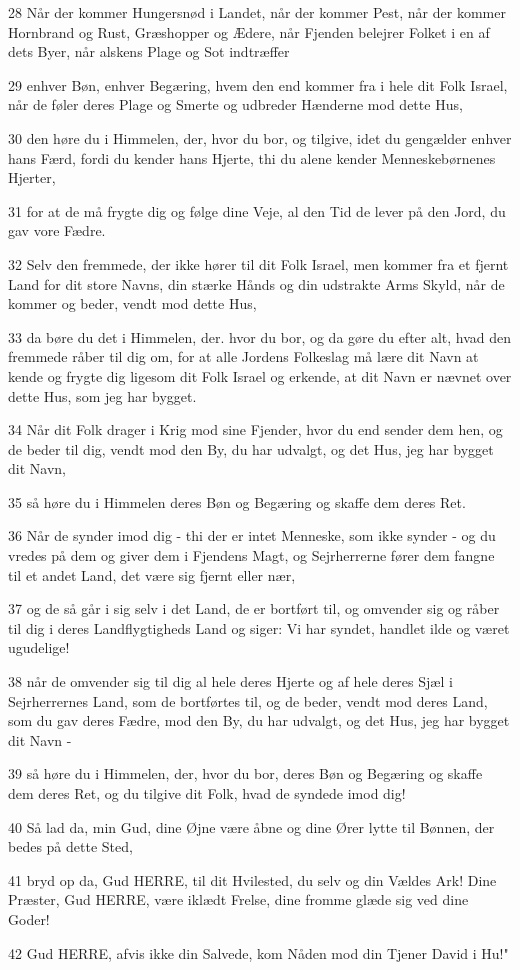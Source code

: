 \par 28 Når der kommer Hungersnød i Landet, når der kommer Pest, når der kommer Hornbrand og Rust, Græshopper og Ædere, når Fjenden belejrer Folket i en af dets Byer, når alskens Plage og Sot indtræffer
\par 29 enhver Bøn, enhver Begæring, hvem den end kommer fra i hele dit Folk Israel, når de føler deres Plage og Smerte og udbreder Hænderne mod dette Hus,
\par 30 den høre du i Himmelen, der, hvor du bor, og tilgive, idet du gengælder enhver hans Færd, fordi du kender hans Hjerte, thi du alene kender Menneskebørnenes Hjerter,
\par 31 for at de må frygte dig og følge dine Veje, al den Tid de lever på den Jord, du gav vore Fædre.
\par 32 Selv den fremmede, der ikke hører til dit Folk Israel, men kommer fra et fjernt Land for dit store Navns, din stærke Hånds og din udstrakte Arms Skyld, når de kommer og beder, vendt mod dette Hus,
\par 33 da børe du det i Himmelen, der. hvor du bor, og da gøre du efter alt, hvad den fremmede råber til dig om, for at alle Jordens Folkeslag må lære dit Navn at kende og frygte dig ligesom dit Folk Israel og erkende, at dit Navn er nævnet over dette Hus, som jeg har bygget.
\par 34 Når dit Folk drager i Krig mod sine Fjender, hvor du end sender dem hen, og de beder til dig, vendt mod den By, du har udvalgt, og det Hus, jeg har bygget dit Navn,
\par 35 så høre du i Himmelen deres Bøn og Begæring og skaffe dem deres Ret.
\par 36 Når de synder imod dig - thi der er intet Menneske, som ikke synder - og du vredes på dem og giver dem i Fjendens Magt, og Sejrherrerne fører dem fangne til et andet Land, det være sig fjernt eller nær,
\par 37 og de så går i sig selv i det Land, de er bortført til, og omvender sig og råber til dig i deres Landflygtigheds Land og siger: Vi har syndet, handlet ilde og været ugudelige!
\par 38 når de omvender sig til dig al hele deres Hjerte og af hele deres Sjæl i Sejrherrernes Land, som de bortførtes til, og de beder, vendt mod deres Land, som du gav deres Fædre, mod den By, du har udvalgt, og det Hus, jeg har bygget dit Navn -
\par 39 så høre du i Himmelen, der, hvor du bor, deres Bøn og Begæring og skaffe dem deres Ret, og du tilgive dit Folk, hvad de syndede imod dig!
\par 40 Så lad da, min Gud, dine Øjne være åbne og dine Ører lytte til Bønnen, der bedes på dette Sted,
\par 41 bryd op da, Gud HERRE, til dit Hvilested, du selv og din Vældes Ark! Dine Præster, Gud HERRE, være iklædt Frelse, dine fromme glæde sig ved dine Goder!
\par 42 Gud HERRE, afvis ikke din Salvede, kom Nåden mod din Tjener David i Hu!"

